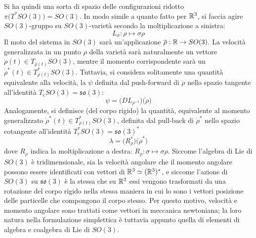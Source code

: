 Si ha quindi una sorta di spazio delle configurazioni ridotto $\pi\big(T^*SO(3)\big) = SO(3)$. In modo simile a quanto fatto per $\mathbb{R}^3$, si faccia agire $SO(3)$-gruppo su $SO(3)$-varietà secondo la moltiplicazione a sinistra:
\begin{equation*}
L_{\sigma}: \rho \longmapsto \sigma \rho 
\end{equation*} 
Il moto del sistema in $SO(3)$ sarà un'applicazione $\overline{\rho}: \mathbb{R} \to SO(3)$. La velocità generalizzata in un punto $\rho$ della varietà sarà naturalmente un vettore $\dot{\rho}(t) \in T_{\overline{\rho}(t)}SO(3)$, mentre il momento corrispondente sarà un $\dot{\rho}^*(t) \in T^*_{\overline{\rho}(t)}SO(3)$. Tuttavia, si considera solitamente una quantità equivalente alla velocità, la  $\psi$ definita dal push-forward di $\dot{\rho}$ nello spazio tangente all'identità $T_e SO(3) = \mathfrak{so(3)}$:
\begin{equation*}
\psi = \big(D L_{\rho^{-1}}\big)\big(\dot{\rho}\big)
\end{equation*}
Analogamente, si definisce  (del corpo rigido) la quantità, equivalente al momento generalizzato $\dot{\rho}^*(t) \in T^*_{\overline{\rho}(t)}SO(3)$, definita dal pull-back di $\dot{\rho}^*$ nello spazio cotangente all'identità $T^*_e SO(3) = \mathfrak{so(3)}^*$
\begin{equation*}
\lambda = \big(R^*_{\rho} \big)\big(\dot{\rho}^*\big)
\end{equation*} 
dove $R_\rho$ indica la moltiplicazione a destra: $R_\rho: \sigma \mapsto \sigma \rho$. Siccome l'algebra di Lie di $SO(3)$ è tridimensionale, sia la velocità angolare che il momento angolare possono essere identificati con vettori di $\mathbb{R}^3 \simeq (\mathbb{R}^3)^*$, e siccome l'azione di $SO(3)$ su $\mathfrak{so(3)}$ è la stessa che su $\mathbb{R}^3$ essi vengono trasformati da una rotazione del corpo rigido nella stessa maniera in cui lo sono i vettori posizione delle particelle che compongono il corpo stesso. Per questo motivo, velocità e momento angolare sono trattati come vettori in meccanica newtoniana; la loro natura nella formulazione simplettica è tuttavia appunto quella di elementi di algebra e coalgebra di Lie di $SO(3)$.

